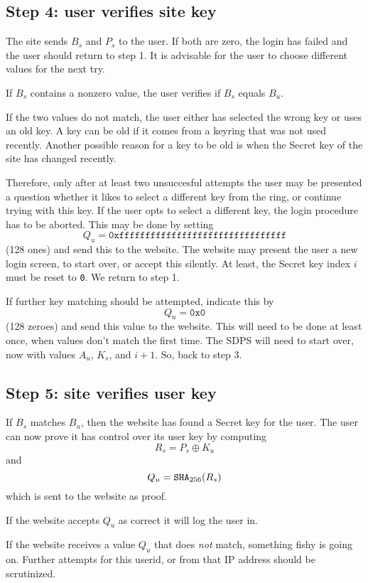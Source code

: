 \subsection{Step 4: user verifies site key}
\label{sec:login_step4}
The site sends $B_s$ and $P_s$ to the user.
If both are zero, the login has failed and the user should return to step 1.
It is advisable for the user to choose different values for the next try.
\par
If $B_s$ contains a nonzero value, the user verifies if $B_s$ equals $B_u$.
\par
If the two values do not match, the user either has selected the wrong key or uses an old key.
A key can be old if it comes from a keyring that was not used recently.
Another possible reason for a key to be old is when the Secret key of the site has changed recently.
\par
Therefore, only after at least two unsuccesful attempts
the user may be presented a question whether it likes to select a different key from the ring, or continue trying with this key.
If the user opts to select a different key, the login procedure has to be aborted.
This may be done by setting
\[Q_u=\mathtt{0xffffffffffffffffffffffffffffffff}\]
(128 ones) and send this to the website.
The website may present the user a new login screen, to start over, or accept this silently.
At least, the Secret key index $i$ must be reset to \texttt{0}.
We return to step 1.
\par
If further key matching should be attempted, indicate this by
\[Q_u=\mathtt{0x0}\]
(128 zeroes) and send this value to the website.
This will need to be done at least once, when values don't match the first time.
The SDPS will need to start over, now with values $A_u$, $K_s$, and $i+1$.
So, back to step 3.

\subsection{Step 5: site verifies user key}
\label{sec:login_step5}
If $B_s$ matches $B_u$, then the website has found a Secret key for the user.
The user can now prove it has control over its user key by computing
\[R_s=P_s \oplus K_u\]
and
\[Q_u=\mathtt{SHA}_{256}(R_s)\]
which is sent to the website as proof.
\par
If the website accepts $Q_u$ as correct it will log the user in.
\par
If the website receives a value $Q_u$ that does \emph{not} match,
something fishy is going on.
Further attempts for this userid, or from that IP address should be scrutinized.

